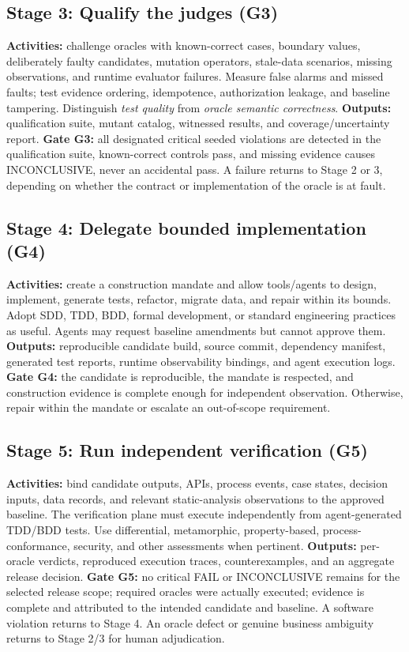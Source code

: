 \documentclass[11pt,a4paper]{article}
\newcommand{\FAIL}{\textsf{FAIL}}
\newcommand{\INC}{\textsf{INCONCLUSIVE}}
\begin{document}
\subsection{Stage 3: Qualify the judges (G3)}
\textbf{Activities:} challenge oracles with known-correct cases, boundary values, deliberately faulty candidates, mutation operators, stale-data scenarios, missing observations, and runtime evaluator failures. Measure false alarms and missed faults; test evidence ordering, idempotence, authorization leakage, and baseline tampering. Distinguish \emph{test quality} from \emph{oracle semantic correctness}. \textbf{Outputs:} qualification suite, mutant catalog, witnessed results, and coverage/uncertainty report. \textbf{Gate G3:} all designated critical seeded violations are detected in the qualification suite, known-correct controls pass, and missing evidence causes \INC{}, never an accidental pass. A failure returns to Stage 2 or 3, depending on whether the contract or implementation of the oracle is at fault.

\subsection{Stage 4: Delegate bounded implementation (G4)}
\textbf{Activities:} create a construction mandate and allow tools/agents to design, implement, generate tests, refactor, migrate data, and repair within its bounds. Adopt SDD, TDD, BDD, formal development, or standard engineering practices as useful. Agents may request baseline amendments but cannot approve them. \textbf{Outputs:} reproducible candidate build, source commit, dependency manifest, generated test reports, runtime observability bindings, and agent execution logs. \textbf{Gate G4:} the candidate is reproducible, the mandate is respected, and construction evidence is complete enough for independent observation. Otherwise, repair within the mandate or escalate an out-of-scope requirement.

\subsection{Stage 5: Run independent verification (G5)}
\textbf{Activities:} bind candidate outputs, APIs, process events, case states, decision inputs, data records, and relevant static-analysis observations to the approved baseline. The verification plane must execute independently from agent-generated TDD/BDD tests. Use differential, metamorphic, property-based, process-conformance, security, and other assessments when pertinent. \textbf{Outputs:} per-oracle verdicts, reproduced execution traces, counterexamples, and an aggregate release decision. \textbf{Gate G5:} no critical \FAIL{} or \INC{} remains for the selected release scope; required oracles were actually executed; evidence is complete and attributed to the intended candidate and baseline. A software violation returns to Stage 4. An oracle defect or genuine business ambiguity returns to Stage 2/3 for human adjudication.
\end{document}
